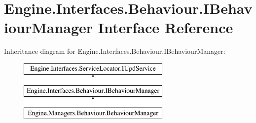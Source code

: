 \hypertarget{a00418}{}\section{Engine.\+Interfaces.\+Behaviour.\+I\+Behaviour\+Manager Interface Reference}
\label{a00418}
Inheritance diagram for Engine.\+Interfaces.\+Behaviour.\+I\+Behaviour\+Manager\+:\begin{figure}[H]
\begin{center}
\leavevmode
\includegraphics[height=3.000000cm]{de/df7/a00418}
\end{center}
\end{figure}
